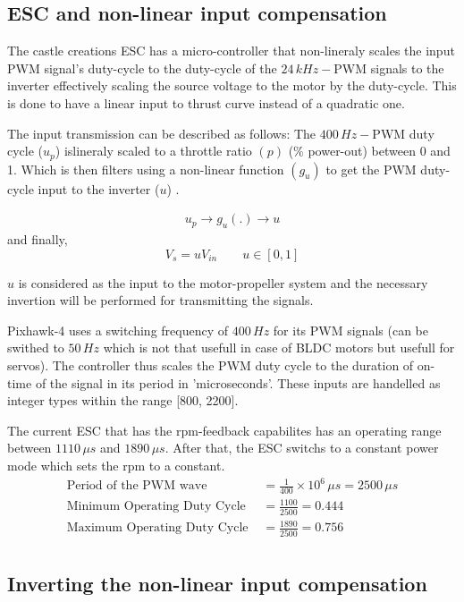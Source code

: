 \subsection{ESC and non-linear input compensation}

The castle creations ESC has a micro-controller that non-lineraly scales the input PWM signal's duty-cycle to the duty-cycle of the $24\,kHz -$PWM signals to the inverter effectively scaling the source voltage to the motor by the duty-cycle. This is done to have a linear input to thrust curve instead of a quadratic one.

The input transmission can be described as follows: The $400\,Hz-$PWM duty cycle ($u_p$) islineraly scaled to a throttle ratio $(p)$ ($\%$ power-out) between 0 and 1. Which is then filters using a non-linear function $(g_u)$ to get the PWM duty-cycle input to the inverter ($u$) \cite{kim2017electric}.

\begin{align*}
    u_p \rightarrow \boxed{g_u(.)} \rightarrow u
\end{align*}
and finally,
$$V_s = u V_{in} \qquad u \in [0, 1]$$

$u$ is considered as the input to the motor-propeller system and the necessary invertion will be performed for transmitting the signals.

Pixhawk-4 uses a switching frequency of $400\,Hz$ for its PWM signals (can be swithed to $50 \, Hz$ which is not that usefull in case of BLDC motors but usefull for servos). The controller thus scales the PWM duty cycle to the duration of on-time of the signal in its period in 'microseconds'. These inputs are handelled as integer types within the range [800, 2200]\cite{px4_pwm}.

The current ESC that has the rpm-feedback capabilites has an operating range between $1110 \, \mu s$ and $1890 \, \mu s$. After that, the ESC switchs to a constant power mode which sets the rpm to a constant.
\begin{align*}
    \text{Period of the PWM wave } &= \frac{1}{400} \times 10^6 \, \mu s = 2500 \, \mu s\\
    \text{Minimum Operating Duty Cycle } &= \frac{1100}{2500} = 0.444\\
    \text{Maximum Operating Duty Cycle } &= \frac{1890}{2500} = 0.756\\
\end{align*}

\subsection{Inverting the non-linear input compensation}

